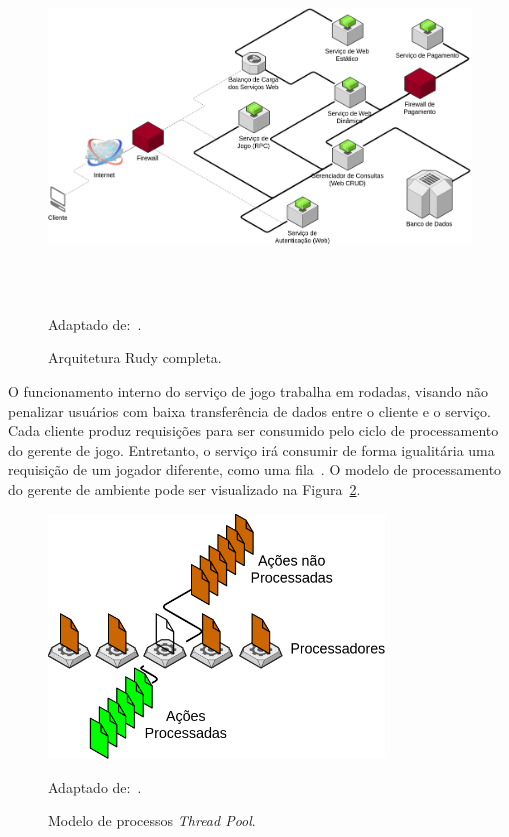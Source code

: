 \begin{figure}[htb!]
  \caption{Arquitetura Rudy completa.}
  \label{full_rudy_fw}
  \includegraphics[height=9.0cm]{arquiteturas/full_rudy_fw.png}
  \centering

  Adaptado de:~\cite{matthiasrudy2011}.
\end{figure}




O funcionamento interno do serviço de jogo trabalha em rodadas, visando não penalizar usuários com baixa transferência de dados entre o cliente e o serviço.
%
Cada cliente produz requisições para ser consumido pelo ciclo de processamento do gerente de jogo.
%
Entretanto, o serviço irá consumir de forma igualitária uma requisição de um jogador diferente, como uma fila~\cite{albion_online_unite, matthiasrudy2011}.
%
O modelo de processamento do gerente de ambiente pode ser visualizado na Figura~\ref{fig:thread_pool}.


\begin{figure}[htb!]
  \caption{Modelo de processos \textit{Thread Pool}.}
  \label{fig:thread_pool}
  \includegraphics[height=6.5cm]{arquiteturas/thread_pool.png}
  \centering

  Adaptado de:~\cite{matthiasrudy2011, Ringler2014Dec}.
\end{figure}

